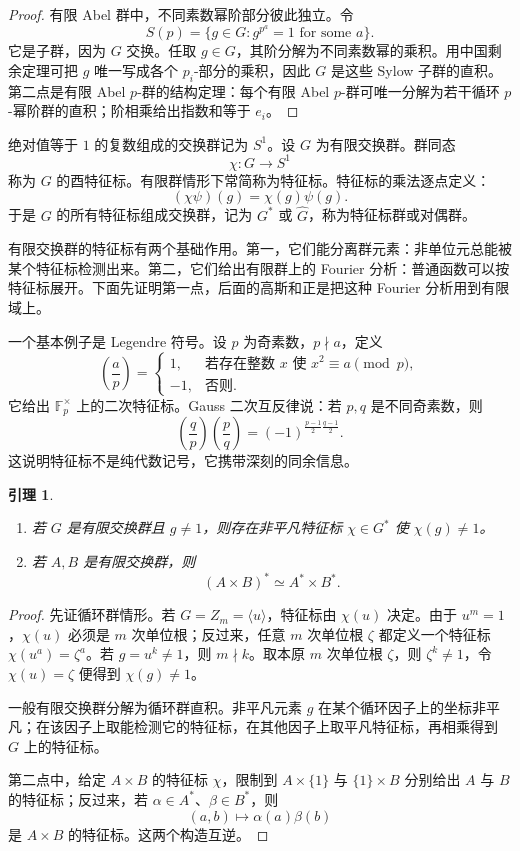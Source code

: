 \documentclass[11pt,a4paper,openany]{ctexbook}
\numberwithin{equation}{chapter}
\newcommand{\F}{\mathbb{F}}
\theoremstyle{plain}
\newtheorem{lemma}[theorem]{引理}
\theoremstyle{definition}
\theoremstyle{remark}
\begin{document}
\begin{proof}
有限 Abel 群中，不同素数幂阶部分彼此独立。令
\[
S(p)=\{g\in G:g^{p^a}=1\text{ for some }a\}.
\]
它是子群，因为 $G$ 交换。任取 $g\in G$，其阶分解为不同素数幂的乘积。用中国剩余定理可把 $g$ 唯一写成各个 $p_i$-部分的乘积，因此 $G$ 是这些 Sylow 子群的直积。第二点是有限 Abel $p$-群的结构定理：每个有限 Abel $p$-群可唯一分解为若干循环 $p$-幂阶群的直积；阶相乘给出指数和等于 $e_i$。
\end{proof}

绝对值等于 $1$ 的复数组成的交换群记为 $S^1$。设 $G$ 为有限交换群。群同态
\[
\chi:G\longrightarrow S^1
\]
称为 $G$ 的酉特征标。有限群情形下常简称为特征标。特征标的乘法逐点定义：
\[
(\chi\psi)(g)=\chi(g)\psi(g).
\]
于是 $G$ 的所有特征标组成交换群，记为 $G^*$ 或 $\widehat G$，称为特征标群或对偶群。

有限交换群的特征标有两个基础作用。第一，它们能分离群元素：非单位元总能被某个特征标检测出来。第二，它们给出有限群上的 Fourier 分析：普通函数可以按特征标展开。下面先证明第一点，后面的高斯和正是把这种 Fourier 分析用到有限域上。

一个基本例子是 Legendre 符号。设 $p$ 为奇素数，$p\nmid a$，定义
\[
\left(\frac ap\right)=
\begin{cases}
1,&\text{若存在整数 }x\text{ 使 }x^2\equiv a\pmod p,\\
-1,&\text{否则}.
\end{cases}
\]
它给出 $\F_p^\times$ 上的二次特征标。Gauss 二次互反律说：若 $p,q$ 是不同奇素数，则
\[
\left(\frac qp\right)\left(\frac pq\right)
=(-1)^{\frac{p-1}{2}\frac{q-1}{2}}.
\]
这说明特征标不是纯代数记号，它携带深刻的同余信息。

\begin{lemma}
\begin{enumerate}[label=(\arabic*)]
\item 若 $G$ 是有限交换群且 $g\ne1$，则存在非平凡特征标 $\chi\in G^*$ 使 $\chi(g)\ne1$。
\item 若 $A,B$ 是有限交换群，则
\[
(A\times B)^*\simeq A^*\times B^*.
\]
\end{enumerate}
\end{lemma}

\begin{proof}
先证循环群情形。若 $G=Z_m=\langle u\rangle$，特征标由 $\chi(u)$ 决定。由于 $u^m=1$，$\chi(u)$ 必须是 $m$ 次单位根；反过来，任意 $m$ 次单位根 $\zeta$ 都定义一个特征标 $\chi(u^a)=\zeta^a$。若 $g=u^k\ne1$，则 $m\nmid k$。取本原 $m$ 次单位根 $\zeta$，则 $\zeta^k\ne1$，令 $\chi(u)=\zeta$ 便得到 $\chi(g)\ne1$。

一般有限交换群分解为循环群直积。非平凡元素 $g$ 在某个循环因子上的坐标非平凡；在该因子上取能检测它的特征标，在其他因子上取平凡特征标，再相乘得到 $G$ 上的特征标。

第二点中，给定 $A\times B$ 的特征标 $\chi$，限制到 $A\times\{1\}$ 与 $\{1\}\times B$ 分别给出 $A$ 与 $B$ 的特征标；反过来，若 $\alpha\in A^*$、$\beta\in B^*$，则
\[
(a,b)\longmapsto \alpha(a)\beta(b)
\]
是 $A\times B$ 的特征标。这两个构造互逆。
\end{proof}
\end{document}

